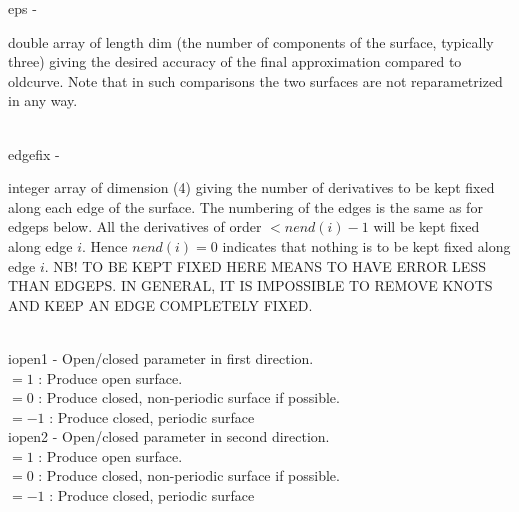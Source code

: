         \>\>    {\fov eps}\> - \>  \begin{minipg2}
                     double array of length dim (the number of
			 components of the surface, typically three)
			 giving the desired accuracy of the
			 final approximation compared to oldcurve.
                        Note that in such comparisons the two
			 surfaces are not reparametrized in any way.
                               \end{minipg2}\\[0.8ex]
        \>\>    {\fov edgefix}\> - \>  \begin{minipg2}
                     integer array of dimension (4) giving the number
			 of derivatives to be kept fixed along each edge
			 of the surface. The numbering of the edges is the
			 same as for edgeps below. All the derivatives of
			 order $< nend(i)-1$ will be kept fixed along
			 edge $i$. Hence $nend(i)=0$ indicates that nothing is
			 to be kept fixed along edge $i$.
                NB! TO BE KEPT FIXED HERE MEANS TO HAVE ERROR LESS THAN
		     EDGEPS. IN GENERAL, IT IS IMPOSSIBLE TO REMOVE KNOTS
                    AND KEEP AN EDGE COMPLETELY FIXED.
                               \end{minipg2}\\[0.8ex]
        \>\>   {\fov iopen1}\> - \> Open/closed parameter in first direction.\\
          \>\>\>\>  $= 1$  : Produce open surface.\\
          \>\>\>\>  $= 0$ : Produce closed, non-periodic surface if possible.\\
          \>\>\>\>  $= -1$ : Produce closed, periodic surface\\
        \>\>   {\fov iopen2}\> - \> Open/closed parameter in second direction.\\
          \>\>\>\>  $= 1$  : Produce open surface.\\
          \>\>\>\>  $= 0$ : Produce closed, non-periodic surface if possible.\\
          \>\>\>\>  $= -1$ : Produce closed, periodic surface\\
